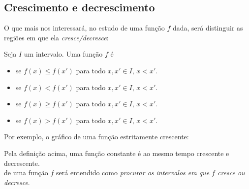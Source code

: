 \subsection{Crescimento e decrescimento}\label{sec_Funcoes_variacao}
O que mais nos interessará, no estudo de uma função $f$ dada,
será distinguir as regiões em que ela \emph{cresce/decresce}:

\begin{defin} Seja $I$ um intervalo.
Uma função $f$ é 
\begin{itemize}
 \item {} se $f(x)\leq f(x')$ para todo $x,x'\in
 I$, $x<x'$.
\item {} se $f(x)<  f(x')$ para todo $x,x'\in
 I$, $x< x'$.
 \item {} se $f(x)\geq f(x')$ para todo $x,x'\in
 I$, $x< x'$.
\item {} se $f(x)>  f(x')$ para todo $x,x'\in
 I$, $x< x'$.
\end{itemize}
\end{defin}

Por exemplo, o gráfico de uma função estritamente crescente:
\begin{center}
\begin{bmlimage}\end{bmlimage}
\end{center}
Pela definição acima, uma função constante é ao mesmo tempo crescente e decrescente.\\

 de uma função $f$ será entendido como \emph{procurar
os intervalos em que $f$ cresce ou decresce}. 

